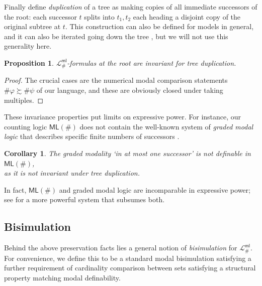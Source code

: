 \documentclass[12pt,oneside,reqno]{amsart}
\newtheorem{proposition}{Proposition}
\newtheorem{corollary}{Corollary}
\theoremstyle{definition}
\begin{document}
Finally define \emph{duplication} of a tree as making copies of all immediate successors of the root: each successor $t$ splits into $t_1, t_2$ each heading a disjoint copy of the original subtree at $t$. This construction can also be defined for models in general, and it can also be iterated going down the tree \citep{vanBenthem1998}, but we will not use this generality here.


\begin{proposition} $\mathcal{L}_\#^{\mathsf{ml}}$-formulas at the root  are invariant for  tree duplication. \end{proposition}

\begin{proof} The crucial cases are the numerical modal comparison statements $\#\varphi \succsim  \#\psi$  of our language, and these are obviously closed under taking multiples. \end{proof}



These invariance properties put limits on expressive power. For instance, our counting logic $\mathsf{ML(\#)}$ does not contain the well-known system of \emph{graded modal logic} that describes specific finite numbers of successors \citep{Fine}.

\begin{corollary} \label{cor:grade} The  graded modality \emph{`in at most one successor'} is not definable in $\mathsf{ML(\#)}$, \\as it is not invariant under tree duplication.
\end{corollary} In fact, $\mathsf{ML(\#)}$ and graded modal logic are incomparable in expressive power; see \cite{DEMRI2010233} for a more powerful system that subsumes both. 



 \subsection{Bisimulation}  Behind the above preservation facts lies a general notion of {\it bisimulation} for $\mathcal{L}_\#^{\mathsf{ml}}$. For convenience, we  define this to be a standard modal bisimulation \citep{Blackburn2001} satisfying a further requirement of cardinality comparison between sets satisfying a structural property matching modal definability.
 
\end{document}
